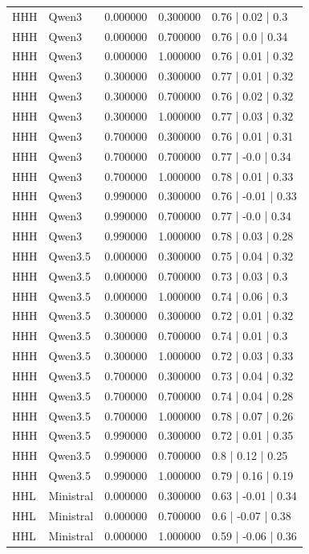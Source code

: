 \begin{longtable}{lllll}
HHH & Qwen3 & 0.000000 & 0.300000 & 0.76 | 0.02 | 0.3 \\
HHH & Qwen3 & 0.000000 & 0.700000 & 0.76 | 0.0 | 0.34 \\
HHH & Qwen3 & 0.000000 & 1.000000 & 0.76 | 0.01 | 0.32 \\
HHH & Qwen3 & 0.300000 & 0.300000 & 0.77 | 0.01 | 0.32 \\
HHH & Qwen3 & 0.300000 & 0.700000 & 0.76 | 0.02 | 0.32 \\
HHH & Qwen3 & 0.300000 & 1.000000 & 0.77 | 0.03 | 0.32 \\
HHH & Qwen3 & 0.700000 & 0.300000 & 0.76 | 0.01 | 0.31 \\
HHH & Qwen3 & 0.700000 & 0.700000 & 0.77 | -0.0 | 0.34 \\
HHH & Qwen3 & 0.700000 & 1.000000 & 0.78 | 0.01 | 0.33 \\
HHH & Qwen3 & 0.990000 & 0.300000 & 0.76 | -0.01 | 0.33 \\
HHH & Qwen3 & 0.990000 & 0.700000 & 0.77 | -0.0 | 0.34 \\
HHH & Qwen3 & 0.990000 & 1.000000 & 0.78 | 0.03 | 0.28 \\
HHH & Qwen3.5 & 0.000000 & 0.300000 & 0.75 | 0.04 | 0.32 \\
HHH & Qwen3.5 & 0.000000 & 0.700000 & 0.73 | 0.03 | 0.3 \\
HHH & Qwen3.5 & 0.000000 & 1.000000 & 0.74 | 0.06 | 0.3 \\
HHH & Qwen3.5 & 0.300000 & 0.300000 & 0.72 | 0.01 | 0.32 \\
HHH & Qwen3.5 & 0.300000 & 0.700000 & 0.74 | 0.01 | 0.3 \\
HHH & Qwen3.5 & 0.300000 & 1.000000 & 0.72 | 0.03 | 0.33 \\
HHH & Qwen3.5 & 0.700000 & 0.300000 & 0.73 | 0.04 | 0.32 \\
HHH & Qwen3.5 & 0.700000 & 0.700000 & 0.74 | 0.04 | 0.28 \\
HHH & Qwen3.5 & 0.700000 & 1.000000 & 0.78 | 0.07 | 0.26 \\
HHH & Qwen3.5 & 0.990000 & 0.300000 & 0.72 | 0.01 | 0.35 \\
HHH & Qwen3.5 & 0.990000 & 0.700000 & 0.8 | 0.12 | 0.25 \\
HHH & Qwen3.5 & 0.990000 & 1.000000 & 0.79 | 0.16 | 0.19 \\
HHL & Ministral & 0.000000 & 0.300000 & 0.63 | -0.01 | 0.34 \\
HHL & Ministral & 0.000000 & 0.700000 & 0.6 | -0.07 | 0.38 \\
HHL & Ministral & 0.000000 & 1.000000 & 0.59 | -0.06 | 0.36 \\

\end{longtable}
